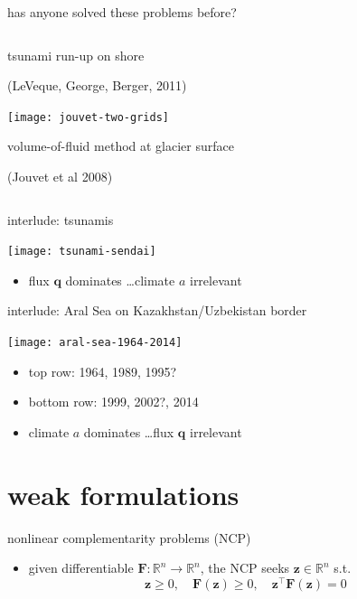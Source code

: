 \documentclass[xcolor={dvipsnames}]{beamer}
\newcommand\bq{\mathbf{q}}
\newcommand\bz{\mathbf{z}}
\newcommand\bF{\mathbf{F}}
\newcommand\RR{\mathbb{R}}
\begin{document}
\begin{frame}{has anyone solved these problems before?}
\begin{columns}
\begin{column}{0.5\textwidth}
\hfill \scriptsize tsunami run-up on shore

\smallskip
\hfill \tiny (LeVeque, George, Berger, 2011)

\medskip
\hfill \texttt{[image: jouvet-two-grids]}

\hfill \scriptsize volume-of-fluid method at glacier surface

\hfill \tiny (Jouvet et al 2008)
\end{column}
\end{columns}
\end{frame}


\begin{frame}{interlude: tsunamis}

\begin{center}
\texttt{[image: tsunami-sendai]}
\end{center}

\begin{itemize}
\item flux $\bq$ dominates \dots climate $a$ irrelevant
\end{itemize}
\end{frame}


\begin{frame}{interlude: Aral Sea on  Kazakhstan/Uzbekistan border}

\begin{center}
\texttt{[image: aral-sea-1964-2014]}
\end{center}

\begin{itemize}
\item top row: 1964, 1989, 1995?
\item bottom row: 1999, 2002?, 2014
\item climate $a$ dominates \dots flux $\bq$ irrelevant
\end{itemize}
\end{frame}


\section{weak formulations}

\begin{frame}{nonlinear complementarity problems (NCP)}

\begin{itemize}
\item given differentiable $\bF:\RR^n \to \RR^n$, the NCP seeks $\bz\in\RR^n$ s.t.
\begin{equation*}
\bz \ge 0, \quad \bF(\bz) \ge 0, \quad \bz^\top \bF(\bz) = 0
\end{equation*}
\end{itemize}
\end{frame}
\end{document}
